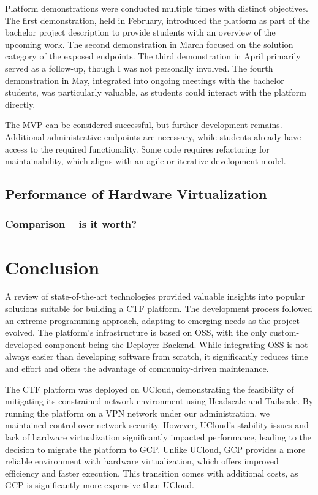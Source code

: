 Platform demonstrations were conducted multiple times with distinct objectives. The first demonstration, held in February, introduced the platform as part of the bachelor project description to provide students with an overview of the upcoming work. The second demonstration in March focused on the solution category of the exposed endpoints. The third demonstration in April primarily served as a follow-up, though I was not personally involved. The fourth demonstration in May, integrated into ongoing meetings with the bachelor students, was particularly valuable, as students could interact with the platform directly.

The MVP can be considered successful, but further development remains. Additional administrative endpoints are necessary, while students already have access to the required functionality. Some code requires refactoring for maintainability, which aligns with an agile or iterative development model.

\section{Performance of Hardware Virtualization}

\subsection{Comparison -- is it worth?}

\chapter{Conclusion}
A review of state-of-the-art technologies provided valuable insights into popular solutions suitable for building a CTF platform. The development process followed an extreme programming approach, adapting to emerging needs as the project evolved. The platform's infrastructure is based on OSS, with the only custom-developed component being the Deployer Backend. While integrating OSS is not always easier than developing software from scratch, it significantly reduces time and effort and offers the advantage of community-driven maintenance.

The CTF platform was deployed on UCloud, demonstrating the feasibility of mitigating its constrained network environment using Headscale and Tailscale. By running the platform on a VPN network under our administration, we maintained control over network security. However, UCloud's stability issues and lack of hardware virtualization significantly impacted performance, leading to the decision to migrate the platform to GCP. Unlike UCloud, GCP provides a more reliable environment with hardware virtualization, which offers improved efficiency and faster execution. This transition comes with additional costs, as GCP is significantly more expensive than UCloud.

